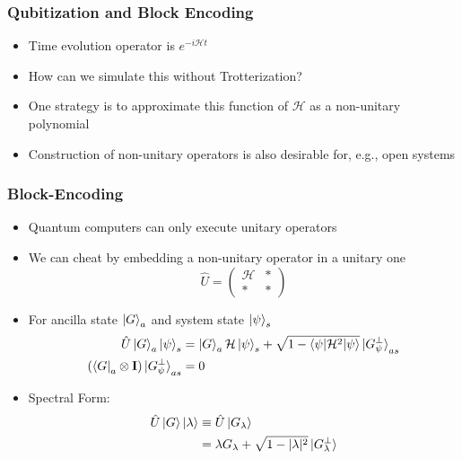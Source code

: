 \documentclass[aspectratio=169]{beamer}
\begin{document}
\begin{frame}
	\frametitle{Qubitization and Block Encoding }
	\begin{itemize}[<+->]
	\item Time evolution operator is $e^{-i\mathcal{H}t}$
	\item How can we simulate this without Trotterization?
	\item One strategy is to approximate this function of $\mathcal{H}$ as a non-unitary polynomial
	\item Construction of non-unitary operators is also desirable for, e.g., open systems	
	\end{itemize}

\end{frame}

\begin{frame}
	\frametitle{Block-Encoding}
	\begin{itemize}[<+->]
	\item Quantum computers can only execute unitary operators
	\item We can cheat by embedding a non-unitary operator in a unitary one
	\begin{equation}
	\hat{U} = \begin{pmatrix}\mathcal{H} & * \\ * & *\end{pmatrix}
	\end{equation}
	\item For ancilla state $\ket{G}_a$ and system state $\ket{\psi}_s$
	\begin{align}
		\nonumber \hat{U}\ket{G}_a\ket{\psi}_s &= \ket{G}_a\mathcal{H}\ket{\psi}_s+\sqrt{1-\braket{\psi|\mathcal{H}^2|\psi}}\ket{G_\psi^{\perp}}_{as}\\
		\nonumber (\bra{G}_a\otimes \mathbf{I})\ket{G_\psi^{\perp}}_{as}&= 0
	\end{align}
	\item Spectral Form:
		\begin{align}
		\nonumber\hat{U}\ket{G}\ket{\lambda}&\equiv\hat{U}\ket{G_\lambda}\\
		\nonumber&=\lambda{G_\lambda}+\sqrt{1-|\lambda|^2}\ket{G_\lambda^{\perp}}
		\end{align}
	\end{itemize}
\end{frame}
\end{document}
